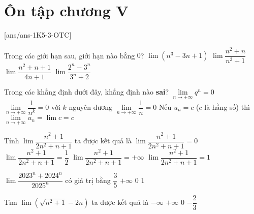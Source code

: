 \section{Ôn tập chương V}
\centerline{}
[ans/ans-1K5-3-OTC]
\begin{ex}%
	Trong các giới hạn sau, giới hạn nào bằng $ 0 $?
	\choice
	{$ \lim(n^3-3n+1) $}
	{\True $ \lim\dfrac{n^2+n}{n^3+1} $}
	{$ \lim\dfrac{n^2+n+1}{4n+1} $}
	{$ \lim\dfrac{2^n-3^n}{3^n+2} $}
\end{ex}
\begin{ex}%
	Trong các khẳng định dưới đây, khẳng định nào \textbf{sai}?
	\choice
	{\True $\lim\limits_{n \to +\infty} q^n=0$}
	{$\lim\limits_{n \to +\infty} \dfrac{1}{n^k}=0$ với $k$ nguyên dương}
	{$\lim\limits_{n \to +\infty} \dfrac{1}{n}=0$}
	{Nếu $u_n=c$ ($c$ là hằng số) thì $\lim\limits_{n \to +\infty} u_n=\lim c=c$}
\end{ex}

\begin{ex}%
	Tính $\lim \dfrac{n^2+1}{2n^2+n+1}$ ta được kết quả là
	\choice
	{$\lim \dfrac{n^2+1}{2n^2+n+1}=0$}
	{\True $\lim \dfrac{n^2+1}{2n^2+n+1}=\dfrac{1}{2}$}
	{$\lim \dfrac{n^2+1}{2n^2+n+1}=+\infty $}
	{$\lim \dfrac{n^2+1}{2n^2+n+1}=1$}
\end{ex}

\begin{ex}%
	$\lim \dfrac{2023^n+2024^n}{2025^n}$ có giá trị bằng
	\choice
	{$\dfrac{3}{5}$}
	{$+\infty$}
	{\True $0$}
	{$1$}
\end{ex}

\begin{ex}%
	Tìm $\lim \left(\sqrt{n^2+1}-2n\right)$ ta được kết quả là
	\choice
	{\True $-\infty$}
	{$+\infty$}
	{$0$}
	{$-\dfrac{2}{3}$}
\end{ex}

